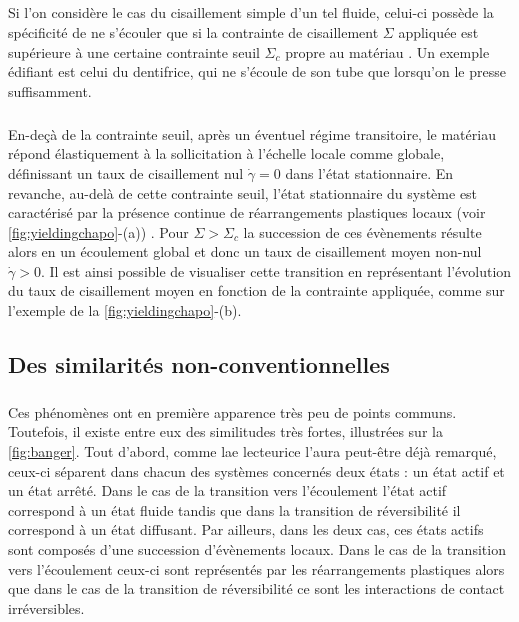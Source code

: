 \subparagraph{}Si l'on considère le cas du cisaillement simple  d'un tel fluide, celui-ci possède la spécificité de ne s'écouler que si la contrainte de cisaillement $\Sigma$ appliquée est supérieure à une certaine contrainte seuil $\Sigma_c$ propre au matériau \cite{bonn_yield_2017, nicolas_deformation_2018}. Un exemple édifiant est celui du dentifrice, qui ne s'écoule de son tube que lorsqu'on le presse suffisamment. 

\subparagraph{}En-deçà de la contrainte seuil, après un éventuel régime transitoire, le matériau répond élastiquement à la sollicitation à l'échelle locale comme globale, définissant un taux de cisaillement nul $\dot{\gamma}=0$ dans l'état stationnaire. En revanche, au-delà de cette contrainte seuil, l'état stationnaire du système est caractérisé par la présence continue de réarrangements plastiques locaux (voir \autoref{fig:yieldingchapo}-(a)) \cite{princen_rheology_1986, biance_topological_2009,picard_elastic_2004}. Pour $\Sigma > \Sigma_c$ la succession de ces évènements résulte alors en un écoulement global et donc un taux de cisaillement moyen non-nul $\dot{\gamma}>0$. Il est ainsi possible de visualiser cette transition en représentant l'évolution du taux de cisaillement moyen en fonction de la contrainte appliquée, comme sur l'exemple de la \autoref{fig:yieldingchapo}-(b).


\subsection{Des similarités non-conventionnelles}

\subparagraph{}Ces phénomènes ont en première apparence très peu de points communs. Toutefois, il existe entre eux des similitudes très fortes, illustrées sur la \autoref{fig:banger}. Tout d'abord, comme lae lecteurice l'aura peut-être déjà remarqué, ceux-ci séparent dans chacun des systèmes concernés deux états : un état actif et un état arrêté. Dans le cas de la transition vers l'écoulement l'état actif correspond à un état fluide tandis que dans la transition de réversibilité il correspond à un état diffusant. Par ailleurs, dans les deux cas, ces états actifs sont composés d'une succession d'évènements locaux. Dans le cas de la transition vers l'écoulement ceux-ci sont représentés par les réarrangements plastiques alors que dans le cas de la transition de réversibilité ce sont les interactions de contact irréversibles.

